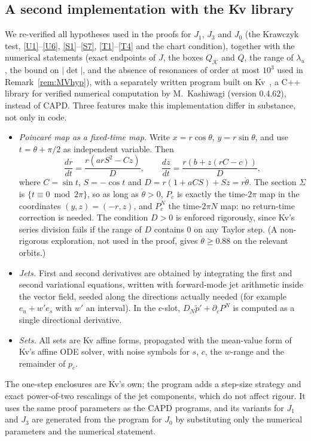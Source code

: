 \documentclass[11pt]{amsart}
\theoremstyle{definition}
\theoremstyle{remark}
\newcommand{\eu}{e_u}
\newcommand{\es}{e_s}
\newcommand{\Kr}{\mathcal{K}}
\begin{document}
\subsection{A second implementation with the Kv library}\label{sec:kv}
We re-verified all hypotheses used in the proofs for $J_1$, $J_3$ and $J_0$ (the Krawczyk test,
\ref{U1}--\ref{U6}, \ref{S1}--\ref{S7}, \ref{T1}--\ref{T4} and the chart condition), together with the
numerical statements (exact endpoints of $J$, the boxes $Q_\Kr$ and $Q$, the range of $\lambda_u$, the bound
on $|\det|$, and the absence of resonances of order at most $10^3$ used in Remark~\ref{rem:MVhyp}), with a separately written program built on Kv~\cite{Kv}, a C++ library for verified numerical
computation by M.~Kashiwagi (version 0.4.62), instead of CAPD. Three features make this implementation
differ in substance, not only in code.
\begin{itemize}[leftmargin=*]
\item \emph{Poincar\'e map as a fixed-time map.} Write $x=r\cos\theta$, $y=r\sin\theta$, and use
$t=\theta+\pi/2$ as independent variable. Then
\[
\frac{dr}{dt}=\frac{r(arS^2-Cz)}{D},\qquad\frac{dz}{dt}=\frac{r(b+z(rC-c))}{D},
\]
where $C=\sin t$, $S=-\cos t$ and $D=r(1+aCS)+Sz=r\dot\theta$. The section $\Sigma$ is $\{t\equiv0\bmod2\pi\}$,
so as long as $\dot\theta>0$, $P_c$ is exactly the time-$2\pi$ map in the coordinates $(y,z)=(-r,z)$, and $P_c^N$
the time-$2\pi N$ map: no return-time correction is needed. The condition $D>0$ is enforced rigorously, since
Kv's series division fails if the range of $D$ contains $0$ on any Taylor step. (A non-rigorous exploration,
not used in the proof, gives $\dot\theta\ge0.88$ on the relevant orbits.)
\item \emph{Jets.} First and second derivatives are obtained by integrating the first and second variational
equations, written with forward-mode jet arithmetic inside the vector field, seeded along the directions
actually needed (for example $\eu+w'\es$ with $w'$ an interval). In the $c$-slot,
$D_N\tilde p'+\partial_cP^N$ is computed as a single directional derivative.
\item \emph{Sets.} All sets are Kv affine forms, propagated with the mean-value form of Kv's affine ODE solver,
with noise symbols for $s$, $c$, the $w$-range and the remainder of $p_c$.
\end{itemize}
The one-step enclosures are Kv's own; the program adds a step-size strategy and exact power-of-two rescalings
of the jet components, which do not affect rigour. It uses the same proof parameters as the CAPD programs, and
its variants for $J_1$ and $J_3$ are generated from the program for $J_0$ by substituting only the numerical
parameters and the numerical statement.
\end{document}
